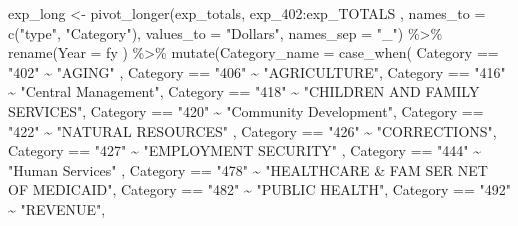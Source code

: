 \documentclass[
  letterpaper,
  DIV=11,
  numbers=noendperiod]{scrreport}
\newenvironment{Shaded}{\begin{snugshade}}{\end{snugshade}}
\newcommand{\AttributeTok}[1]{\textcolor[rgb]{0.40,0.45,0.13}{#1}}
\newcommand{\FunctionTok}[1]{\textcolor[rgb]{0.28,0.35,0.67}{#1}}
\newcommand{\NormalTok}[1]{\textcolor[rgb]{0.00,0.23,0.31}{#1}}
\newcommand{\OtherTok}[1]{\textcolor[rgb]{0.00,0.23,0.31}{#1}}
\newcommand{\SpecialCharTok}[1]{\textcolor[rgb]{0.37,0.37,0.37}{#1}}
\newcommand{\StringTok}[1]{\textcolor[rgb]{0.13,0.47,0.30}{#1}}
\begin{document}
\begin{Shaded}
\begin{Highlighting}[]
\NormalTok{exp\_long }\OtherTok{\textless{}{-}} \FunctionTok{pivot\_longer}\NormalTok{(exp\_totals, exp\_402}\SpecialCharTok{:}\NormalTok{exp\_TOTALS , }\AttributeTok{names\_to =} \FunctionTok{c}\NormalTok{(}\StringTok{"type"}\NormalTok{, }\StringTok{"Category"}\NormalTok{), }\AttributeTok{values\_to =} \StringTok{"Dollars"}\NormalTok{, }\AttributeTok{names\_sep =} \StringTok{"\_"}\NormalTok{) }\SpecialCharTok{\%\textgreater{}\%} 
  \FunctionTok{rename}\NormalTok{(}\AttributeTok{Year =}\NormalTok{ fy ) }\SpecialCharTok{\%\textgreater{}\%} 
  \FunctionTok{mutate}\NormalTok{(}\AttributeTok{Category\_name =} 
           \FunctionTok{case\_when}\NormalTok{(}
\NormalTok{            Category }\SpecialCharTok{==} \StringTok{"402"} \SpecialCharTok{\textasciitilde{}} \StringTok{"AGING"}\NormalTok{ ,}
\NormalTok{            Category }\SpecialCharTok{==} \StringTok{"406"} \SpecialCharTok{\textasciitilde{}} \StringTok{"AGRICULTURE"}\NormalTok{, }
\NormalTok{             Category }\SpecialCharTok{==} \StringTok{"416"} \SpecialCharTok{\textasciitilde{}} \StringTok{"Central Management"}\NormalTok{,}
\NormalTok{            Category }\SpecialCharTok{==} \StringTok{"418"} \SpecialCharTok{\textasciitilde{}} \StringTok{"CHILDREN AND FAMILY SERVICES"}\NormalTok{, }
\NormalTok{             Category }\SpecialCharTok{==} \StringTok{"420"} \SpecialCharTok{\textasciitilde{}} \StringTok{"Community Development"}\NormalTok{,}
\NormalTok{            Category }\SpecialCharTok{==} \StringTok{"422"} \SpecialCharTok{\textasciitilde{}} \StringTok{"NATURAL RESOURCES"}\NormalTok{ ,}
\NormalTok{             Category }\SpecialCharTok{==} \StringTok{"426"} \SpecialCharTok{\textasciitilde{}} \StringTok{"CORRECTIONS"}\NormalTok{,}
\NormalTok{            Category }\SpecialCharTok{==} \StringTok{"427"} \SpecialCharTok{\textasciitilde{}} \StringTok{"EMPLOYMENT SECURITY"}\NormalTok{ ,}
\NormalTok{             Category }\SpecialCharTok{==} \StringTok{"444"} \SpecialCharTok{\textasciitilde{}} \StringTok{"Human Services"}\NormalTok{ ,}
\NormalTok{           Category }\SpecialCharTok{==} \StringTok{"478"} \SpecialCharTok{\textasciitilde{}} \StringTok{"HEALTHCARE \& FAM SER NET OF MEDICAID"}\NormalTok{, }
\NormalTok{            Category }\SpecialCharTok{==} \StringTok{"482"} \SpecialCharTok{\textasciitilde{}} \StringTok{"PUBLIC HEALTH"}\NormalTok{, }
\NormalTok{            Category }\SpecialCharTok{==} \StringTok{"492"} \SpecialCharTok{\textasciitilde{}} \StringTok{"REVENUE"}\NormalTok{, }

\end{Highlighting}
\end{Shaded}
\end{document}
